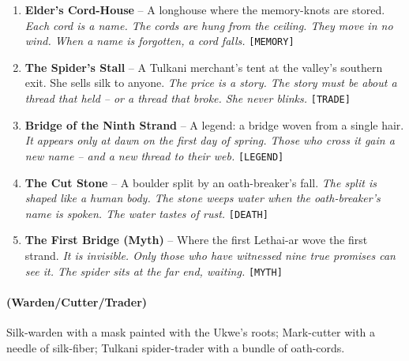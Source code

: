 \begin{enumerate}
\item \textbf{Elder's Cord-House} -- A longhouse where the memory-knots are stored.
  \hfill \textit{Each cord is a name. The cords are hung from the ceiling. They move in no wind. When a name is forgotten, a cord falls.} \texttt{[MEMORY]}
\item[\card{\spadesuit}{J}] \textbf{The Spider's Stall} -- A Tulkani merchant's tent at the valley's southern exit. She sells silk to anyone.
  \hfill \textit{The price is a story. The story must be about a thread that held -- or a thread that broke. She never blinks.} \texttt{[TRADE]}
\item[\card{\spadesuit}{Q}] \textbf{Bridge of the Ninth Strand} -- A legend: a bridge woven from a single hair.
  \hfill \textit{It appears only at dawn on the first day of spring. Those who cross it gain a new name -- and a new thread to their web.} \texttt{[LEGEND]}
\item[\card{\spadesuit}{K}] \textbf{The Cut Stone} -- A boulder split by an oath-breaker's fall.
  \hfill \textit{The split is shaped like a human body. The stone weeps water when the oath-breaker's name is spoken. The water tastes of rust.} \texttt{[DEATH]}
\item[\card{\spadesuit}{A}] \textbf{The First Bridge (Myth)} -- Where the first Lethai-ar wove the first strand.
  \hfill \textit{It is invisible. Only those who have witnessed nine true promises can see it. The spider sits at the far end, waiting.} \texttt{[MYTH]}
\end{enumerate}

\paragraph*{(Warden/Cutter/Trader)} Silk-warden with a mask painted with the Ukwe's roots; Mark-cutter with a needle of silk-fiber; Tulkani spider-trader with a bundle of oath-cords.

